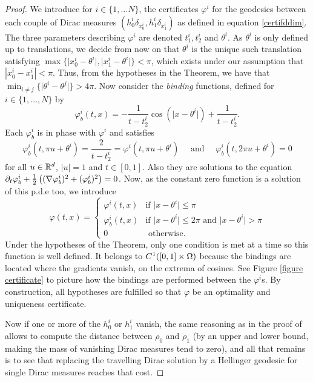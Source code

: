 \begin{proof}
We introduce for $i\in \{1,\dots N\}$, the certificates $\varphi^i$ for the geodesics between each couple of Dirac measures $(h^i_0 \delta_{x^i_0}, h^i_1 \delta_{x^i_1})$ as defined in equation \eqref{certifddim}. The three parameters describing $\varphi^i$ are denoted $t^i_1, t^i_2$ and $\theta^i$. As $\theta^i$ is only defined up to translations, we decide from now on that $\theta^i$ is the unique such translation satisfying $\max\{ \vert x^i_0-\theta^i \vert, \vert x^i_1-\theta^i \vert \}< \pi$, which exists under our assumption that $|x_0^i - x_1^i|<\pi$. Thus, from the hypotheses in the Theorem, we have that $\min_{i \neq j}\{\vert \theta^i- \theta^j \vert \} > 4 \pi$. Now consider the \emph{binding} functions, defined for $i \in \{1,\dots,N \}$ by
\[
\varphi^i_b(t,x)=-\frac{1}{t-t^i_2} \cos(\vert x-\theta^i \vert ) + \frac{1}{t-t^i_2}. 
\]
Each $\varphi^i_b$ is in phase with $\varphi^i$ and satisfies 
\[
\varphi^i_b(t,\pi u + \theta^i)=\frac{2}{t-t_2^i}=\varphi^i(t,\pi u+ \theta^i) 
\quad \text{ and } \quad
\varphi^i_b(t,2\pi u+ \theta^i)=0
\]
for all $u\in \mathbb{R}^d$, $\vert u \vert = 1$ and $t\in[0,1]$. Also they are solutions to the equation $\partial_t \varphi^i_b +\frac12 \left( (\nabla \varphi^i_b )^2 + (\varphi^i_b)^2 \right) = 0$. Now, as the constant zero function is a solution of this p.d.e too, we introduce
\begin{equation*}
\varphi(t,x)=
\begin{cases}
\varphi^i (t,x) & \text{if }  \vert x - \theta^i \vert \leq \pi \\
\varphi^i_b (t,x) & \text{if }  \vert x - \theta^i \vert \leq 2\pi  \text{ and } \vert x - \theta^i \vert > \pi\\
0 & \text{ otherwise.}
\end{cases}
\end{equation*}
Under the hypotheses of the Theorem, only one condition is met at a time so this function is well defined. It belongs to $C^1([0,1]\times \Omega)$ because the bindings are located where the gradients vanish, on the extrema of cosines. See Figure \ref{figure certificate} to picture how the bindings are performed between the $\varphi^i$s. By construction, all hypotheses are fulfilled so that $\varphi$ be an optimality and uniqueness certificate.

Now if one or more of the $h^i_0$ or $h^i_1$ vanish, the same reasoning as in the proof of  allows to compute the distance between $\rho_0$ and $\rho_1$ (by an upper and lower bound, making the mass of vanishing Dirac measures tend to zero), and all that remains is to see that replacing the travelling Dirac solution by a Hellinger geodesic for single Dirac measures reaches that cost. 
\end{proof}

